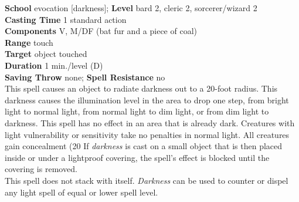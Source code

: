 \textbf{School }evocation [darkness]; \textbf{Level }bard 2, cleric 2, sorcerer/wizard 2\\
\textbf{Casting Time }1 standard action\\
\textbf{Components }V, M/DF (bat fur and a piece of coal)\\
\textbf{Range }touch\\
\textbf{Target }object touched\\
\textbf{Duration }1 min./level (D)\\
\textbf{Saving Throw} none; \textbf{Spell Resistance} no\\
This spell causes an object to radiate darkness out to a 20-foot radius. This darkness causes the illumination level in the area to drop one step, from bright light to normal light, from normal light to dim light, or from dim light to darkness. This spell has no effect in an area that is already dark. Creatures with light vulnerability or sensitivity take no penalties in normal light. All creatures gain concealment (20%
If \textit{darkness} is cast on a small object that is then placed inside or under a lightproof covering, the spell's effect is blocked until the covering is removed.\\
This spell does not stack with itself. \textit{Darkness} can be used to counter or dispel any light spell of equal or lower spell level. \\
